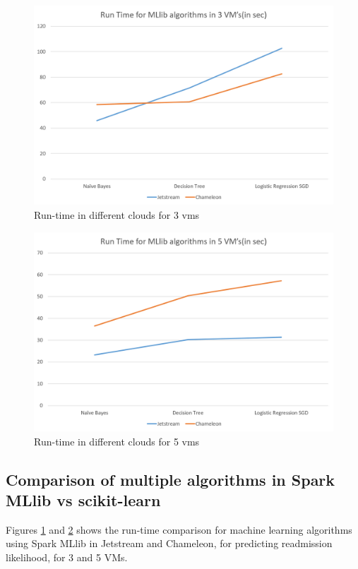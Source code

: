 \documentclass[9pt,twocolumn,twoside]{../../styles/osajnl}
\begin{document}
\begin{figure}[h]
\centering
\includegraphics[scale=0.4]{images/algoruntime3.png}
\caption{Run-time in different clouds for 3 vms}
\label{fig:bench1}
\end{figure}

\begin{figure}[h]
	\centering
	\includegraphics[scale=0.4]{images/algoruntime5.png}
	\caption{Run-time in different clouds for 5 vms}
	\label{fig:bench2}
\end{figure}
\subsection{Comparison of multiple algorithms in Spark MLlib vs scikit-learn}


Figures \ref{fig:bench1} and \ref{fig:bench2} shows the run-time comparison for machine learning algorithms using Spark MLlib in Jetstream and Chameleon, for predicting readmission likelihood, for 3 and 5 VMs.
\end{document}
